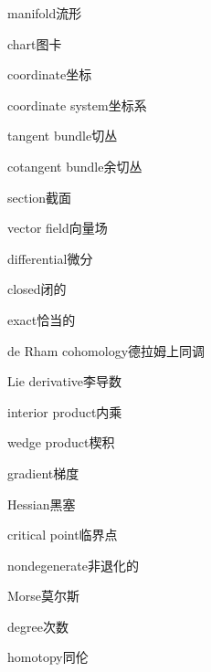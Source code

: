 \begin{multicols}{2}
\raggedright
\setlength{\parindent}{0pt}
\setlength{\parskip}{0.16em}
\linespread{1.02}\selectfont
manifold\hspace{0.9em}流形\par
chart\hspace{0.9em}图卡\par
coordinate\hspace{0.9em}坐标\par
coordinate system\hspace{0.9em}坐标系\par
tangent bundle\hspace{0.9em}切丛\par
cotangent bundle\hspace{0.9em}余切丛\par
section\hspace{0.9em}截面\par
vector field\hspace{0.9em}向量场\par
differential\hspace{0.9em}微分\par
closed\hspace{0.9em}闭的\par
exact\hspace{0.9em}恰当的\par
de Rham cohomology\hspace{0.9em}德拉姆上同调\par
Lie derivative\hspace{0.9em}李导数\par
interior product\hspace{0.9em}内乘\par
wedge product\hspace{0.9em}楔积\par
gradient\hspace{0.9em}梯度\par
Hessian\hspace{0.9em}黑塞\par
critical point\hspace{0.9em}临界点\par
nondegenerate\hspace{0.9em}非退化的\par
Morse\hspace{0.9em}莫尔斯\par
degree\hspace{0.9em}次数\par
homotopy\hspace{0.9em}同伦\par

\end{multicols}
